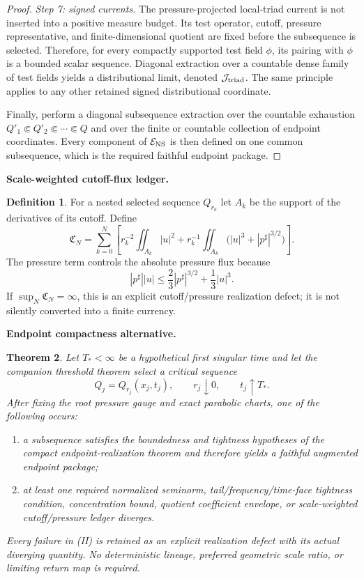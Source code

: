 \documentclass[11pt]{article}
\newtheorem{theorem}{Theorem}[section]
\theoremstyle{definition}\newtheorem{problem}[theorem]{Problem}
\theoremstyle{definition}
\newtheorem{definition}[theorem]{Definition}
\theoremstyle{remark}
\begin{document}
\begin{proof}
\emph{Step 7: signed currents.}
The pressure-projected local-triad current is not inserted into a positive
measure budget.  Its test operator, cutoff, pressure representative, and
finite-dimensional quotient are fixed before the subsequence is selected.
Therefore, for every compactly supported test field \(\phi\), its pairing with
\(\phi\) is a bounded scalar sequence.  Diagonal extraction over a countable
dense family of test fields yields a distributional limit, denoted
\(\mathcal J_{\rm triad}\).  The same principle applies to any other retained
signed distributional coordinate.

Finally, perform a diagonal subsequence extraction over the countable
exhaustion \(Q'_1\Subset Q'_2\Subset\cdots\Subset Q\) and over the finite or
countable collection of endpoint coordinates.  Every component of
\(\mathcal E_{\rm NS}\) is then defined on one common subsequence, which is the
required faithful endpoint package.
\end{proof}

\medskip
\noindent\textbf{Scale-weighted cutoff-flux ledger.}
\begin{definition}
For a nested selected sequence \(Q_{r_k}\) let
\(A_k\) be the support of the derivatives of its cutoff.  Define
\[
\mathfrak C_N
=
\sum_{k=0}^{N}
\left[
 r_k^{-2}\iint_{A_k}|u|^2
 +
 r_k^{-1}\iint_{A_k}
 \bigl(|u|^3+|p^\sharp|^{3/2}\bigr)
\right].
\]
The pressure term controls the absolute pressure flux because
\[
 |p^\sharp||u|
 \le \frac23|p^\sharp|^{3/2}+\frac13|u|^3.
\]
If \(\sup_N\mathfrak C_N=\infty\), this is an explicit cutoff/pressure
realization defect; it is not silently converted into a finite currency.
\end{definition}

\medskip
\noindent\textbf{Endpoint compactness alternative.}
\begin{theorem}
Let \(T_*<\infty\) be a hypothetical first singular time and let the companion
threshold theorem select a critical sequence
\[
Q_j=Q_{r_j}(x_j,t_j),\qquad r_j\downarrow0,\qquad t_j\uparrow T_*.
\]
After fixing the root pressure gauge and exact parabolic charts, one of the
following occurs:
\begin{enumerate}[label=(\roman*),leftmargin=*]
\item a subsequence satisfies the boundedness and tightness hypotheses of the
      compact endpoint-realization theorem and therefore yields a faithful
      augmented endpoint package;
\item at least one required normalized seminorm, tail/frequency/time-face
      tightness condition, concentration bound, quotient coefficient envelope,
      or scale-weighted cutoff/pressure ledger diverges.
\end{enumerate}
Every failure in (II) is retained as an explicit realization defect with its
actual diverging quantity.  No deterministic lineage, preferred geometric
scale ratio, or limiting return map is required.
\end{theorem}
\end{document}
